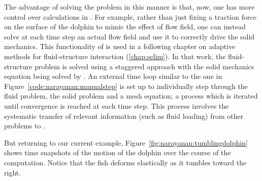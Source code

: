 The advantage of solving the problem in this manner is that, now, one
has more control over calculations in \twist{}. For example, rather
than just fixing a traction force on the surface of the dolphin to
mimic the effect of flow field, one can instead solve at each time
step an actual flow field and use it to correctly drive the solid
mechanics. This functionality of \twist{} is used in a following
chapter on adaptive methods for fluid-structure interaction
(\ref{chap:selim}). In that work, the fluid-structure problem is
solved using a staggered approach with the solid mechanics equation
being solved by \twist. An external time loop similar to the one in
Figure~\ref{code:narayanan:manualstep} is set up to individually step
through the fluid problem, the solid problem and a mesh equation; a
process which is iterated until convergence is reached at each time
step. This process involves the systematic transfer of relevant
information (such as fluid loading) from other problems to \twist.

But returning to our current example,
Figure~\ref{fig:narayanan:tumblingdolphin} shows time snapshots of the
motion of the dolphin over the course of the computation. Notice that
the fish deforms elastically as it tumbles toward the right.

